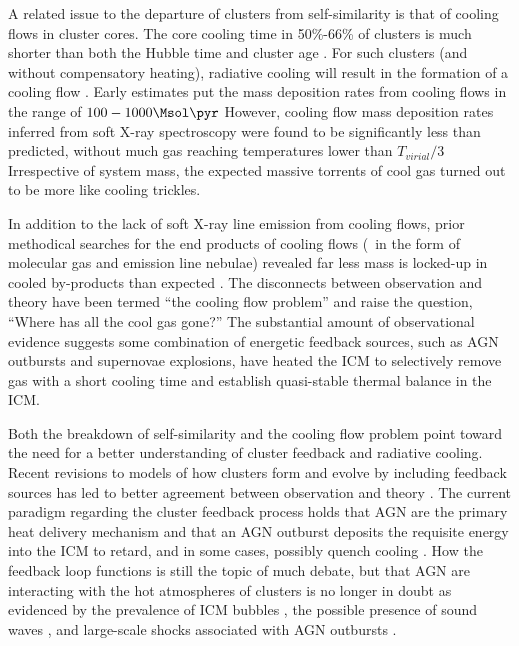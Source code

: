 \documentclass{emulateapj}
\begin{document}
A related issue to the departure of clusters from self-similarity is
that of cooling flows in cluster cores. The core cooling time in
50\%-66\% of clusters is much shorter than both the Hubble time and
cluster age \citep{1984ApJ...285....1S, 1992MNRAS.258..177E, white97,
  1998MNRAS.298..416P, 2005MNRAS.359.1481B}. For such clusters (and
without compensatory heating), radiative cooling will result in the
formation of a cooling flow \citep[see][for a
  review]{fabiancfreview}. Early estimates put the mass deposition
rates from cooling flows in the range of $100-1000 \Msol \pyr$
\citep[\eg][]{1984ApJ...276...38J, 1994MNRAS.270L...1E,
  1998MNRAS.298..416P} However, cooling flow mass deposition rates
inferred from soft X-ray spectroscopy were found to be significantly
less than predicted, without much gas reaching temperatures lower than
$T_{virial}/3$ \citep{tamura01, peterson01, peterson03,
  2004A&A...413..415K} Irrespective of system mass, the expected
massive torrents of cool gas turned out to be more like cooling
trickles.

In addition to the lack of soft X-ray line emission from cooling
flows, prior methodical searches for the end products of cooling flows
(\ie\ in the form of molecular gas and emission line nebulae) revealed
far less mass is locked-up in cooled by-products than expected
\citep{heckman89, mcnamara90, odea94, voit95}. The disconnects between
observation and theory have been termed ``the cooling flow problem''
and raise the question, ``Where has all the cool gas gone?'' The
substantial amount of observational evidence suggests some combination
of energetic feedback sources, such as AGN outbursts and supernovae
explosions, have heated the ICM to selectively remove gas with a short
cooling time and establish quasi-stable thermal balance in the ICM.

Both the breakdown of self-similarity and the cooling flow problem
point toward the need for a better understanding of cluster feedback
and radiative cooling. Recent revisions to models of how clusters form
and evolve by including feedback sources has led to better agreement
between observation and theory \citep{bower06, croton06, saro06,
  bower08}. The current paradigm regarding the cluster feedback
process holds that AGN are the primary heat delivery mechanism and
that an AGN outburst deposits the requisite energy into the ICM to
retard, and in some cases, possibly quench cooling \citep[see][for a
  review]{mcnamrev}. How the feedback loop functions is still the
topic of much debate, but that AGN are interacting with the hot
atmospheres of clusters is no longer in doubt as evidenced by the
prevalence of ICM bubbles \citep[\eg][]{birzan04,dunn08}, the possible
presence of sound waves \citep{2003MNRAS.344L..43F,
  2008arXiv0808.2384S}, and large-scale shocks associated with AGN
outbursts \citep{2005ApJ...635..894F, ms0735, 2005ApJ...628..629N}.
\end{document}
